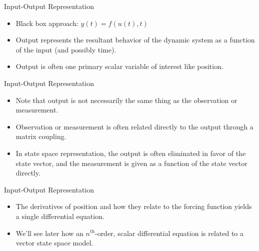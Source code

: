 \begin{frame}
Input-Output Representation
 \begin{itemize}
 \item Black box approach:  $y(t)=f(u(t),t)$\\

 

 \item Output represents the resultant behavior of the dynamic system as a function of the input (and possibly time).
 \item Output is often one primary scalar variable of interest like position.
\end{itemize}
\end{frame}

\begin{frame}
Input-Output Representation
 \begin{itemize}
 \item Note that output is not necessarily the same thing as the observation or measurement.
 \item Observation or measurement is often related directly to the output through a matrix coupling.
 \item In state space representation, the output is often eliminated in favor of the state vector, and the measurement is given as a function of the state vector directly.
\end{itemize}
\end{frame}

\begin{frame}
Input-Output Representation
 \begin{itemize}
 \item The derivatives of position and how they relate to the forcing function yields a single differential equation.
 \item We'll see later how an $n^\text{th}$-order, scalar differential equation is related to a vector state space model. 
\end{itemize}
\end{frame}
